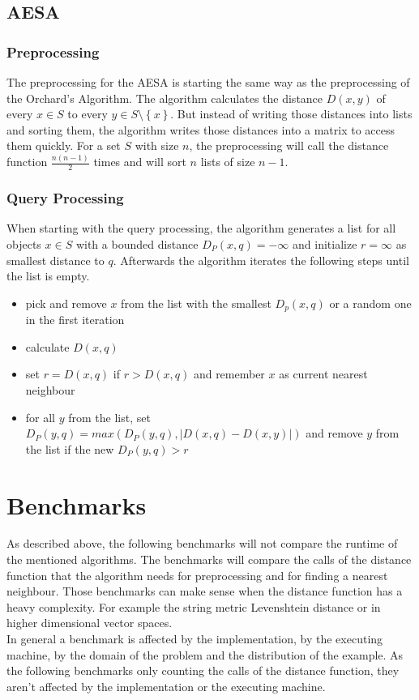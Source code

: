 \documentclass[runningheads,a4paper]{llncs}
\begin{document}
\subsection{AESA}

\subsubsection{Preprocessing}

The preprocessing for the AESA is starting the same way as the preprocessing of the Orchard’s Algorithm. The algorithm
calculates the distance $D(x, y)$ of every $x \in S$ to every $y \in S\setminus\left\{ {x}\right\}$. But instead of
writing those distances into lists and sorting them, the algorithm writes those distances into a matrix to access them
quickly. For a set $S$ with size $n$, the preprocessing will call the distance function $\frac{n(n-1)}{2}$ times and
will sort $n$ lists of size $n-1$.

\subsubsection{Query Processing}

When starting with the query processing, the algorithm generates a list for all objects $x \in S$ with a bounded
distance $D_P(x, q) = -\infty$ and initialize $r = \infty$ as smallest distance to $q$. Afterwards the algorithm
iterates the following steps until the list is empty.
\begin{itemize}
	\item pick and remove $x$ from the list with the smallest $D_p(x, q)$ or a random one in the first iteration
	\item calculate $D(x, q)$
	\item set $r = D(x, q)$ if $r > D(x, q)$ and remember $x$ as current nearest neighbour
	\item for all $y$ from the list, set $D_P(y, q) = max(D_P(y, q), |D(x, q) - D(x, y)|)$ and remove $y$ from the list
		if the new $D_P(y, q) > r$
\end{itemize}

\section{Benchmarks}

As described above, the following benchmarks will not compare the runtime of the mentioned algorithms. The benchmarks
will compare the calls of the distance function that the algorithm needs for preprocessing and for finding a nearest
neighbour. Those benchmarks can make sense when the distance function has a heavy complexity. For example the string
metric Levenshtein distance or in higher dimensional vector spaces.\\
In general a benchmark is affected by the implementation, by the executing machine, by the domain of the problem
and the distribution of the example. As the following benchmarks only counting the calls of the distance function, they
aren't affected by the implementation or the executing machine.
\end{document}

